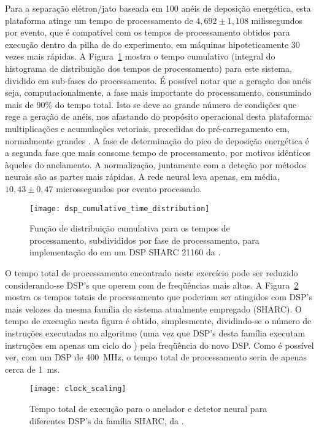 Para a separação elétron/jato baseada em 100 anéis de deposição energética,
esta plataforma atinge um tempo de processamento de $4,692 \pm 1,108$
milissegundos por evento, que é compatível com os tempos de processamento
obtidos para execução dentro da pilha de  do experimento, em
máquinas hipoteticamente 30 vezes mais rápidas. A Figura~\ref{fig:dsp-cumul}
mostra o tempo cumulativo (integral do histograma de distribuição dos tempos
de processamento) para este sistema, dividido em sub-fases do processamento. É
possível notar que a geração dos anéis seja, computacionalmente, a fase mais
importante do processamento, consumindo mais de 90\% do tempo total. Isto se
deve ao grande número de condições que rege a geração de anéis, nos afastando
do propósito operacional desta plataforma: multiplicações e acumulações
vetoriais, precedidas do pré-carregamento em, normalmente grandes
. A fase de determinação do pico de deposição energética é a
segunda fase que mais consome tempo de processamento, por motivos idênticos
àqueles do anelamento. A normalização, juntamente com a deteção por métodos
neurais são as partes mais rápidas. A rede neural leva apenas, em média,
$10,43\pm0,47$ microssegundos por evento processado.


\begin{figure}
\begin{center}
\texttt{[image: dsp\_cumulative\_time\_distribution]}
\caption{Função de distribuição cumulativa para os tempos de processamento,
subdivididos por fase de processamento, para implementação do
 em um DSP SHARC 21160 da .}
\label{fig:dsp-cumul}
\end{center}
\end{figure}

O tempo total de processamento encontrado neste exercício pode ser reduzido
considerando-se DSP's que operem com  de freqüências mais altas. A
Figura~\ref{fig:dsp-clock-time} mostra os tempos totais de processamento que
poderiam ser atingidos com DSP's mais velozes da mesma família do sistema
atualmente empregado (SHARC). O tempo de execução nesta figura é obtido,
simplesmente, dividindo-se o número de instruções executadas no algoritmo (uma
vez que DSP's desta família executam instruções em apenas um ciclo do
) pela freqüência do novo DSP. Como é possível ver, com um DSP de
400~MHz, o tempo total de processamento seria de apenas cerca de 1~ms.

\begin{figure}
\begin{center}
\texttt{[image: clock\_scaling]}
\caption{Tempo total de execução para o anelador e detetor neural para
diferentes DSP's da família SHARC, da .}
\label{fig:dsp-clock-time}
\end{center}
\end{figure}


